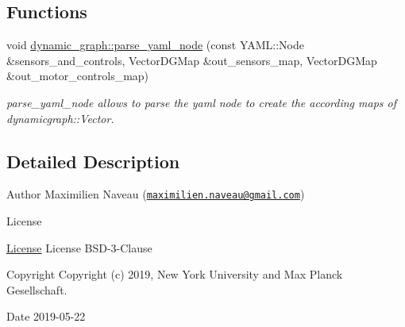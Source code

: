\subsection*{Functions}
\begin{DoxyCompactItemize}
\item 
void \hyperlink{namespacedynamic__graph_a3473e2d5502f8a2bff6b43cbc2d35e07}{dynamic\+\_\+graph\+::parse\+\_\+yaml\+\_\+node} (const Y\+A\+M\+L\+::\+Node \&sensors\+\_\+and\+\_\+controls, Vector\+D\+G\+Map \&out\+\_\+sensors\+\_\+map, Vector\+D\+G\+Map \&out\+\_\+motor\+\_\+controls\+\_\+map)
\begin{DoxyCompactList}\small\item\em parse\+\_\+yaml\+\_\+node allows to parse the yaml node to create the according maps of dynamicgraph\+::\+Vector. \end{DoxyCompactList}\end{DoxyCompactItemize}


\subsection{Detailed Description}
\begin{DoxyAuthor}{Author}
Maximilien Naveau (\href{mailto:maximilien.naveau@gmail.com}{\tt maximilien.\+naveau@gmail.\+com}) 
\end{DoxyAuthor}
\begin{DoxyRefDesc}{License}
\item[\hyperlink{license__license000017}{License}]License B\+S\+D-\/3-\/\+Clause \end{DoxyRefDesc}
\begin{DoxyCopyright}{Copyright}
Copyright (c) 2019, New York University and Max Planck Gesellschaft. 
\end{DoxyCopyright}
\begin{DoxyDate}{Date}
2019-\/05-\/22 
\end{DoxyDate}
